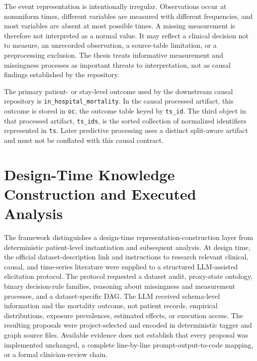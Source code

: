 The event representation is intentionally irregular.  Observations occur at nonuniform times, different variables are measured with different frequencies, and most variables are absent at most possible times.  A missing measurement is therefore not interpreted as a normal value.  It may reflect a clinical decision not to measure, an unrecorded observation, a source-table limitation, or a preprocessing exclusion.  The thesis treats informative measurement and missingness processes as important threats to interpretation, not as causal findings established by the repository.

The primary patient- or stay-level outcome used by the downstream causal repository is \texttt{in\_hospital\_mortality}.  In the causal processed artifact, this outcome is stored in \texttt{oc}, the outcome table keyed by \texttt{ts\_id}.  The third object in that processed artifact, \texttt{ts\_ids}, is the sorted collection of normalized identifiers represented in \texttt{ts}.  Later predictive processing uses a distinct split-aware artifact and must not be conflated with this causal contract.

\section{Design-Time Knowledge Construction and Executed Analysis}
\label{sec:problem-definition-study-design:design-time-executed-layers}

The framework distinguishes a design-time representation-construction layer from deterministic patient-level instantiation and subsequent analysis.  At design time, the official dataset-description link and instructions to research relevant clinical, causal, and time-series literature were supplied to a structured LLM-assisted elicitation protocol.  The protocol requested a dataset audit, proxy-state ontology, binary decision-rule families, reasoning about missingness and measurement processes, and a dataset-specific DAG.  The LLM received schema-level information and the mortality outcome, not patient records, empirical distributions, exposure prevalences, estimated effects, or execution access.  The resulting proposals were project-selected and encoded in deterministic tagger and graph source files.  Available evidence does not establish that every proposal was implemented unchanged, a complete line-by-line prompt-output-to-code mapping, or a formal clinician-review chain.

